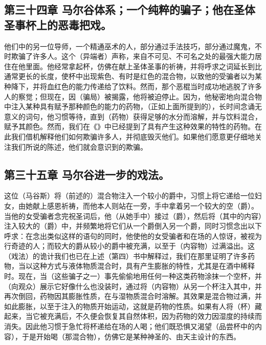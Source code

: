 
\subsection{第三十四章 马尔谷体系；一个纯粹的骗子；他在圣体圣事杯上的恶毒把戏。}

他们中的另一位导师，一个精通巫术的人，部分通过手法技巧，部分通过魔鬼，不时欺骗了许多人。这个（异端者）声称，来自不可见、不可名之处的最强大能力居住在他里面。他经常拿起杯，仿佛在献上圣体圣事的祈祷，并将呼求之词延长到比通常更长的长度，使杯中出现紫色、有时是红色的混合物，以致他的受骗者以为某种降下，并将血红色的能力传递给了饮料。然而，那个恶棍当时成功地逃脱了许多人的察觉；但现在，因（骗局）被揭露，他将被迫停止。因为，他秘密地向混合物中注入某种具有赋予那种颜色的能力的药物，（正如上面所提到的），长时间念诵无意义的词句，他习惯等待，直到（药物）获得足够的水分而溶解，并与饮料混合，赋予其颜色。然而，我们在《》中已经提到了具有产生这种效果的特性的药物。在此我们借机解释他们如何欺骗许多人，并彻底毁灭他们。如果他们愿意更仔细地关注我们所说的陈述，他们就会意识到的欺骗。\par


\subsection{第三十五章 马尔谷进一步的戏法。}

这位（马谷斯）将（前述的）混合物注入一个较小的爵中，习惯上将它递给一位妇女，由她献上感恩祈祷，而他本人则站在一旁，手中拿着另一个较大的空（爵）。当他的女受骗者念完祝圣词后，他（从她手中）接过（爵），然后将（其中的内容）注入较大的（爵）中，并频繁地将它们从一个爵倒入另一个爵，同时习惯念出以下呼求：在念出类似这样的语句的同时，他使他的女受骗者和在场的人惊讶，被视为行奇迹的人；而较大的爵从较小的爵中被充满，以至于（内容物）过满溢出。这（戏法）的诡计我们也已在上述（第四）书中解释过，我们在那里证明了许多药物，当以这种方式与液体物质混合时，具有产生膨胀的特性，尤其是在酒中稀释时。现在，当（这些骗子之一）事先偷偷地用任何一种这类药物涂抹一个空杯，并（向观众）展示它好像什么也没装时，通过将（内容物）从另一个杯注入其中，并再次倒回，药物因其膨胀性质，在与湿物质混合时溶解。其效果是混合物过满，并如此膨胀，以至于注入的物质开始运动，这就是药物的性质。如果有人将（杯）藏起来，当它被充满后，不久便会恢复其自然体积，因为药物的效力因湿度的持续而消失。因此他习惯于急忙将杯递给在场的人喝；他们既恐惧又渴望（品尝杯中的内容），于是开始喝（那混合物），仿佛它是某种神圣的、由天主设计的东西。\par

